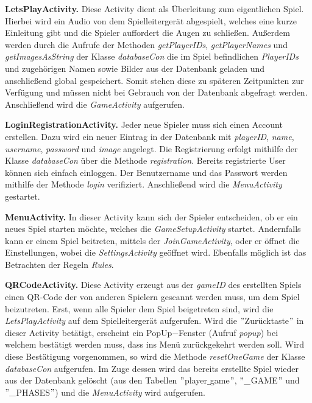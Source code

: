 \documentclass[12pt]{article}
\begin{document}
\textbf{LetsPlayActivity.}
Diese Activity dient als Überleitung zum eigentlichen Spiel. Hierbei wird ein Audio von dem Spielleitergerät abgespielt, welches eine kurze Einleitung gibt und die Spieler auffordert die Augen zu schließen. Außerdem werden durch die Aufrufe der Methoden \textit{getPlayerIDs}, \textit{getPlayerNames} und \textit{getImagesAsString} der Klasse \textit{databaseCon} die im Spiel befindlichen \textit{PlayerIDs} und zugehörigen Namen sowie Bilder aus der Datenbank geladen und anschließend global gespeichert. Somit stehen diese zu späteren Zeitpunkten zur Verfügung und müssen nicht bei Gebrauch von der Datenbank abgefragt werden. 
Anschließend wird die \textit{GameActivity} aufgerufen.

\vspace{0,3 cm}      
     
\textbf{LoginRegistrationActivity.}
Jeder neue Spieler muss sich einen Account erstellen. Dazu wird ein neuer Eintrag in der Datenbank mit \textit{playerID}, \textit{name}, \textit{username}, \textit{password} und \textit{image} angelegt. Die Registrierung erfolgt mithilfe der Klasse \textit{databaseCon} über die Methode \textit{registration}. Bereits registrierte User können sich einfach einloggen. Der Benutzername und das Passwort werden mithilfe der Methode \textit{login} verifiziert.
Anschließend wird die \textit{MenuActivity} gestartet.

\vspace{0,3 cm} 
     
\textbf{MenuActivity.}
In dieser Activity kann sich der Spieler entscheiden, ob er ein neues Spiel starten möchte, welches
die \textit{GameSetupActivity} startet.
Andernfalls kann er einem Spiel beitreten, mittels der \textit{JoinGameActivity}, oder er öffnet die Einstellungen, wobei die \textit{SettingsActivity} geöffnet wird.
Ebenfalls möglich ist das Betrachten der Regeln \textit{Rules}.

\vspace{0,3 cm}
      
\textbf{QRCodeActivity.}
Diese Activity erzeugt aus der \textit{gameID} des erstellten Spiels einen QR-Code der von anderen Spielern
gescannt werden muss, um dem Spiel beizutreten. Erst, wenn alle Spieler dem Spiel beigetreten sind,  wird die \textit{LetsPlayActivity} auf dem Spielleitergerät aufgerufen. 
Wird die $"$Zurücktaste$"$ in dieser Activity betätigt, erscheint ein PopUp$-$Fenster (Aufruf \textit{popup}) bei 
welchem bestätigt werden muss, dass ins Menü zurückgekehrt werden soll. Wird diese Bestätigung vorgenommen, 
so wird die Methode \textit{resetOneGame} der Klasse \textit{databaseCon} aufgerufen. Im Zuge dessen wird das bereits erstellte
Spiel wieder aus der Datenbank gelöscht (aus den Tabellen $"$player$\_$game$"$, $"\_$GAME$"$ und $"\_$PHASES$"$) und die \textit{MenuActivity} wird aufgerufen.
\end{document}
